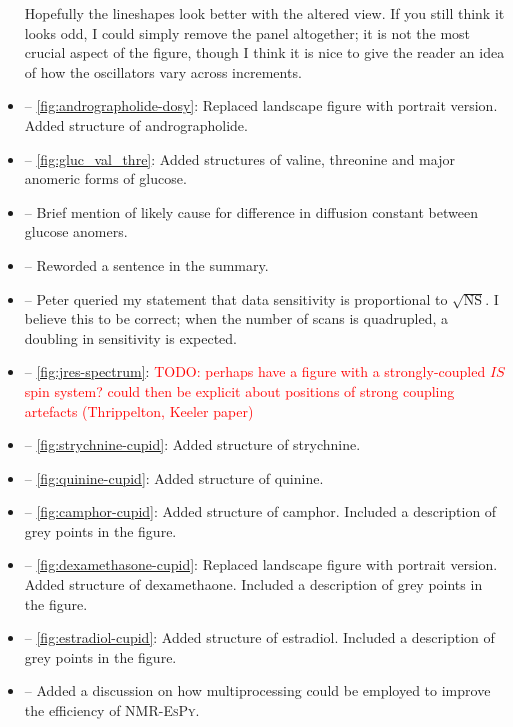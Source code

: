 \documentclass[12pt]{article}
\begin{document}
\begin{itemize}
            Hopefully the lineshapes look better with the altered view. If you
            still think it looks odd, I could simply remove the panel
            altogether; it is not the most crucial aspect of the figure, though
            I think it is nice to give the reader an idea of how the
            oscillators vary across increments.
        \item {} -- \cref{fig:andrographolide-dosy}:
            Replaced landscape figure with portrait version. Added structure of
            andrographolide.
        \item {} -- \cref{fig:gluc_val_thre}: Added
            structures of valine, threonine and major anomeric forms of glucose.
        \item {} -- Brief mention of likely cause for
            difference in diffusion constant between glucose anomers.
        \item {} -- Reworded a sentence in the summary.
        \item {} -- Peter queried my statement that data
            sensitivity is proportional to $\sqrt{\text{NS}}$. I believe this
            to be correct; when the number of scans is quadrupled, a doubling
            in sensitivity is expected.
        \item {} -- \cref{fig:jres-spectrum}: \textcolor{red}{TODO:
            perhaps have a figure with a strongly-coupled $IS$ spin system?
            could then be explicit about positions of strong coupling
        artefacts (Thrippelton, Keeler paper)}
        \item {} -- \cref{fig:strychnine-cupid}: Added
            structure of strychnine.
        \item {} -- \cref{fig:quinine-cupid}: Added structure
            of quinine.
        \item {} -- \cref{fig:camphor-cupid}: Added structure
            of camphor. Included a description of grey points in
            the figure.
        \item {} -- \cref{fig:dexamethasone-cupid}:
            Replaced landscape figure with portrait version. Added structure of
            dexamethaone. Included a description of grey points in
            the figure.
        \item {} -- \cref{fig:estradiol-cupid}: Added
            structure of estradiol. Included a description of grey points in
            the figure.
        \item {} -- Added a discussion on how
            multiprocessing could be employed to improve the efficiency of
            \textsc{NMR-EsPy}.
    \end{itemize}
\end{document}

